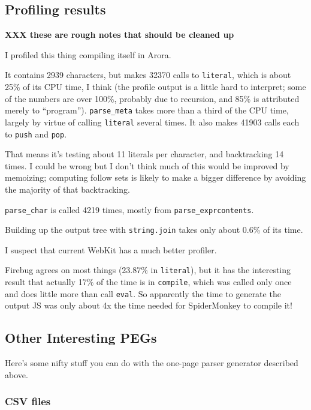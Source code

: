 \documentclass[
]{article}
\begin{document}
\hypertarget{profiling-results}{%
\subsection{Profiling results}\label{profiling-results}}

\textbf{XXX these are rough notes that should be cleaned up}

I profiled this thing compiling itself in Arora.

It contains 2939 characters, but makes 32370 calls to \texttt{literal},
which is about 25\% of its CPU time, I think (the profile output is a
little hard to interpret; some of the numbers are over 100\%, probably
due to recursion, and 85\% is attributed merely to ``program'').
\texttt{parse\_meta} takes more than a third of the CPU time, largely by
virtue of calling \texttt{literal} several times. It also makes 41903
calls each to \texttt{push} and \texttt{pop}.

That means it's testing about 11 literals per character, and
backtracking 14 times. I could be wrong but I don't think much of this
would be improved by memoizing; computing follow sets is likely to make
a bigger difference by avoiding the majority of that backtracking.

\texttt{parse\_char} is called 4219 times, mostly from
\texttt{parse\_exprcontents}.

Building up the output tree with \texttt{string.join} takes only about
0.6\% of its time.

I suspect that current WebKit has a much better profiler.

Firebug agrees on most things (23.87\% in \texttt{literal}), but it has
the interesting result that actually 17\% of the time is in
\texttt{compile}, which was called only once and does little more than
call \texttt{eval}. So apparently the time to generate the output JS was
only about 4x the time needed for SpiderMonkey to compile it!

\hypertarget{other-interesting-pegs}{%
\subsection{Other Interesting PEGs}\label{other-interesting-pegs}}

Here's some nifty stuff you can do with the one-page parser generator
described above.

\hypertarget{csv-files}{%
\subsubsection{CSV files}\label{csv-files}}
\end{document}
